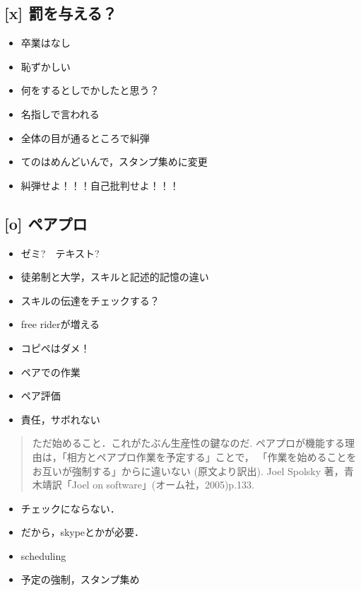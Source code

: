 \documentclass{jsarticle}
\begin{document}
\subsection{[x] 罰を与える？　}
\label{sec:orgb0e59e1}
\begin{itemize}
\item 卒業はなし
\item 恥ずかしい
\item 何をするとしでかしたと思う？
\item 名指しで言われる
\item 全体の目が通るところで糾弾
\item てのはめんどいんで，スタンプ集めに変更
\item 糾弾せよ！！！自己批判せよ！！！
\end{itemize}
\subsection{[o] ペアプロ}
\label{sec:org1ab6ecb}
\begin{itemize}
\item ゼミ?　テキスト?
\item 徒弟制と大学，スキルと記述的記憶の違い
\item スキルの伝達をチェックする？
\item free riderが増える
\item コピペはダメ！
\item ペアでの作業
\item ペア評価
\item 責任，サボれない
\end{itemize}

\begin{quote}
ただ始めること．これがたぶん生産性の鍵なのだ.
ペアプロが機能する理由は，「相方とペアプロ作業を予定する」ことで，
「作業を始めることをお互いが強制する」からに違いない
(原文より訳出).
Joel Spolsky 著，青木靖訳「Joel on software」(オーム社，2005)p.133.
\end{quote}

\begin{itemize}
\item チェックにならない．
\item だから，skypeとかが必要．

\item scheduling
\item 予定の強制，スタンプ集め
\end{itemize}
\end{document}
